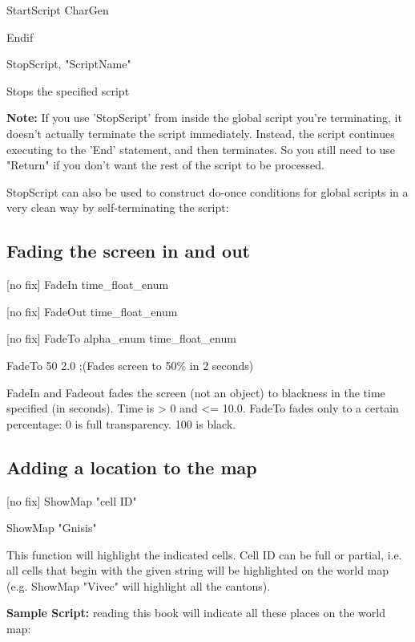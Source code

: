 \documentclass[
]{article}
\begin{document}
StartScript CharGen

Endif

StopScript, "ScriptName"

Stops the specified script

\textbf{Note:} If you use 'StopScript' from inside the global script
you're terminating, it doesn't actually terminate the script
immediately. Instead, the script continues executing to the 'End'
statement, and then terminates. So you still need to use "Return" if you
don't want the rest of the script to be processed.

StopScript can also be used to construct do-once conditions for global
scripts in a very clean way by self-terminating the script:



\hypertarget{fading-the-screen-in-and-out}{%
\subsection{Fading the screen in and
out}\label{fading-the-screen-in-and-out}}

{[}no fix{]} FadeIn time\_float\_enum

{[}no fix{]} FadeOut time\_float\_enum

{[}no fix{]} FadeTo alpha\_enum time\_float\_enum

FadeTo 50 2.0 ;(Fades screen to 50\% in 2 seconds)

FadeIn and Fadeout fades the screen (not an object) to blackness in the
time specified (in seconds). Time is \textgreater{} 0 and \textless=
10.0. FadeTo fades only to a certain percentage: 0 is full transparency.
100 is black.

\hypertarget{adding-a-location-to-the-map}{%
\subsection{Adding a location to the
map}\label{adding-a-location-to-the-map}}

{[}no fix{]} ShowMap "cell ID"

ShowMap "Gnisis"

This function will highlight the indicated cells. Cell ID can be full or
partial, i.e. all cells that begin with the given string will be
highlighted on the world map (e.g. ShowMap "Vivec" will highlight all
the cantons).

\textbf{Sample Script:} reading this book will indicate all these places
on the world map:
\end{document}
